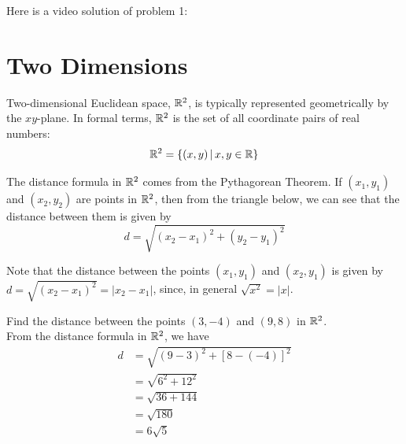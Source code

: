 \documentclass[handout]{ximera}
\begin{document}
Here is a video solution of problem 1:\\
\begin{foldable}
\end{foldable}


\section{Two Dimensions}
Two-dimensional Euclidean space, $\mathbb R^2$, is typically represented geometrically by the $xy$-plane. 
In formal terms, $\mathbb R^2$ is the set of all coordinate pairs of real numbers:
 \[
\mathbb R^2 = \{(x,y) \,|\, x, y \in \mathbb R\}
\]

The distance formula in $\mathbb R^2$ comes from the Pythagorean Theorem. If $(x_1, y_1)$ and $(x_2, y_2)$ are points in $\mathbb R^2$, then from the triangle below,
we can see that the distance between them is given by 
\[
d = \sqrt{(x_2 - x_1)^2 + (y_2 - y_1)^2}
\]



\begin{image}
\end{image}
Note that the distance between the points $(x_1, y_1)$ and $(x_2, y_1)$ is given by 
$d = \sqrt{(x_2-x_1)^2} = |x_2 -x_1|$, since, in general $\sqrt{x^2} = |x|$.

\begin{example}[Example 2]
Find the distance between the points $(3,-4)$ and $(9,8)$ in $\mathbb R^2$.\\
From the distance formula in $\mathbb R^2$, we have
\begin{align*}
d &= \sqrt{(9-3)^2 + [8-(-4)]^2}\\
  &= \sqrt{6^2 + 12^2}\\
  & = \sqrt{36 +144}\\
  &= \sqrt{180}\\
  &= 6\sqrt 5
\end{align*}
\end{example}
\end{document}
